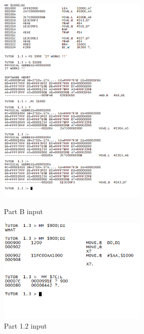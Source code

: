 \documentclass{article}
\begin{document}
					\begin{figure}[!htb]
					\begin{center}
					\includegraphics[width=0.65\textwidth]{PARTb} 
					\caption{Part B input}
					\includegraphics[width=0.65\textwidth]{a} 
					\caption{Part 1.2 input}
					\end{center}\end{figure}
					
\end{document}
